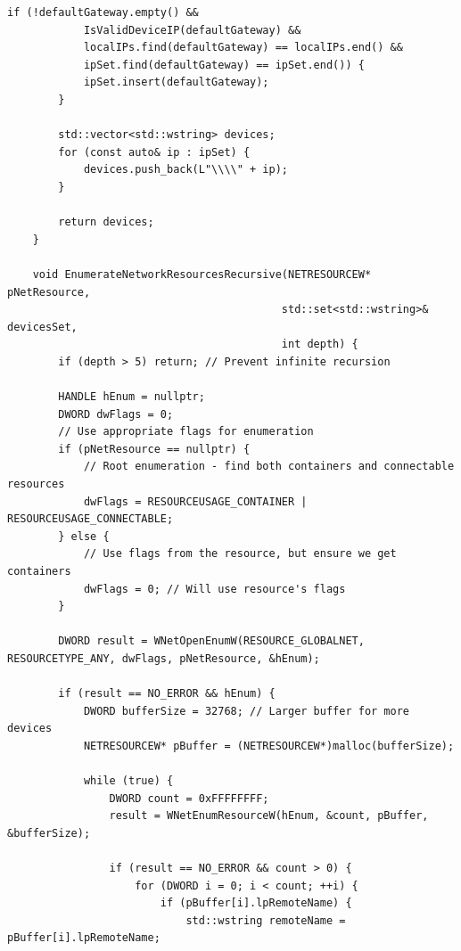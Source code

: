\begin{lstlisting}[style=CodeListing]
        if (!defaultGateway.empty() && 
            IsValidDeviceIP(defaultGateway) && 
            localIPs.find(defaultGateway) == localIPs.end() &&
            ipSet.find(defaultGateway) == ipSet.end()) {
            ipSet.insert(defaultGateway);
        }
        
        std::vector<std::wstring> devices;
        for (const auto& ip : ipSet) {
            devices.push_back(L"\\\\" + ip);
        }
        
        return devices;
    }
    
    void EnumerateNetworkResourcesRecursive(NETRESOURCEW* pNetResource, 
                                           std::set<std::wstring>& devicesSet, 
                                           int depth) {
        if (depth > 5) return; // Prevent infinite recursion
        
        HANDLE hEnum = nullptr;
        DWORD dwFlags = 0;
        // Use appropriate flags for enumeration
        if (pNetResource == nullptr) {
            // Root enumeration - find both containers and connectable resources
            dwFlags = RESOURCEUSAGE_CONTAINER | RESOURCEUSAGE_CONNECTABLE;
        } else {
            // Use flags from the resource, but ensure we get containers
            dwFlags = 0; // Will use resource's flags
        }
        
        DWORD result = WNetOpenEnumW(RESOURCE_GLOBALNET, RESOURCETYPE_ANY, dwFlags, pNetResource, &hEnum);
        
        if (result == NO_ERROR && hEnum) {
            DWORD bufferSize = 32768; // Larger buffer for more devices
            NETRESOURCEW* pBuffer = (NETRESOURCEW*)malloc(bufferSize);
            
            while (true) {
                DWORD count = 0xFFFFFFFF;
                result = WNetEnumResourceW(hEnum, &count, pBuffer, &bufferSize);
                
                if (result == NO_ERROR && count > 0) {
                    for (DWORD i = 0; i < count; ++i) {
                        if (pBuffer[i].lpRemoteName) {
                            std::wstring remoteName = pBuffer[i].lpRemoteName;
                            

\end{lstlisting}
